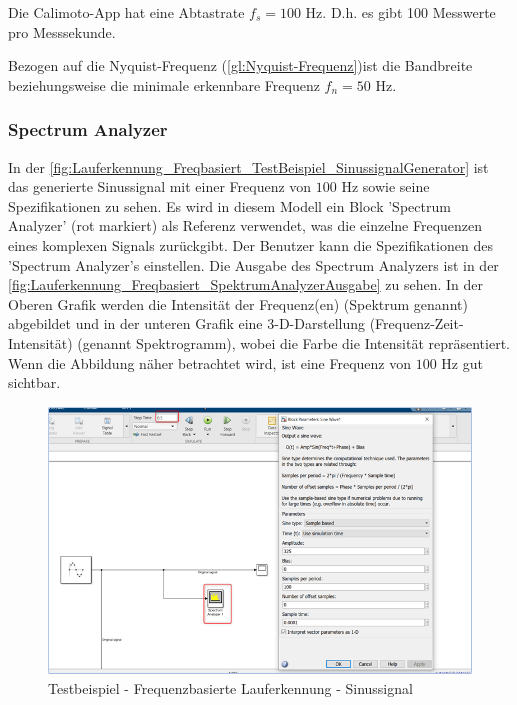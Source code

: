 Die Calimoto-App hat eine Abtastrate $f_s = 100$ Hz. D.h. es gibt 100 Messwerte pro Messsekunde.

Bezogen auf die Nyquist-Frequenz (\autoref{gl:Nyquist-Frequenz})ist die Bandbreite beziehungsweise die minimale erkennbare Frequenz $f_n = 50$ Hz.

\subsubsection{Spectrum Analyzer}
In der \autoref{fig:Lauferkennung_Freqbasiert_TestBeispiel_SinussignalGenerator} ist das generierte Sinussignal mit einer Frequenz von $100$ Hz sowie seine Spezifikationen zu sehen.
Es wird in diesem Modell ein Block 'Spectrum Analyzer' (rot markiert) als Referenz verwendet, was die einzelne Frequenzen eines komplexen Signals zurückgibt. Der Benutzer kann die Spezifikationen des 'Spectrum Analyzer's einstellen. Die Ausgabe des Spectrum Analyzers ist in der \autoref{fig:Lauferkennung_Freqbasiert_SpektrumAnalyzerAusgabe} zu sehen. In der Oberen Grafik werden die Intensität der Frequenz(en) (Spektrum genannt) abgebildet und in der unteren Grafik eine 3-D-Darstellung (Frequenz-Zeit-Intensität) (genannt Spektrogramm), wobei die Farbe die Intensität repräsentiert. Wenn die Abbildung näher betrachtet wird, ist eine Frequenz von $100$ Hz gut sichtbar.

\begin{figure}[H]
	\centering
	\includegraphics[width=\linewidth]{Bilder/Lauferkennung_Freqbasiert_TestBeispiel_SinussignalGenerator.png}
	\caption{Testbeispiel - Frequenzbasierte Lauferkennung - Sinussignal}
	\label{fig:Lauferkennung_Freqbasiert_TestBeispiel_SinussignalGenerator}
\end{figure}

